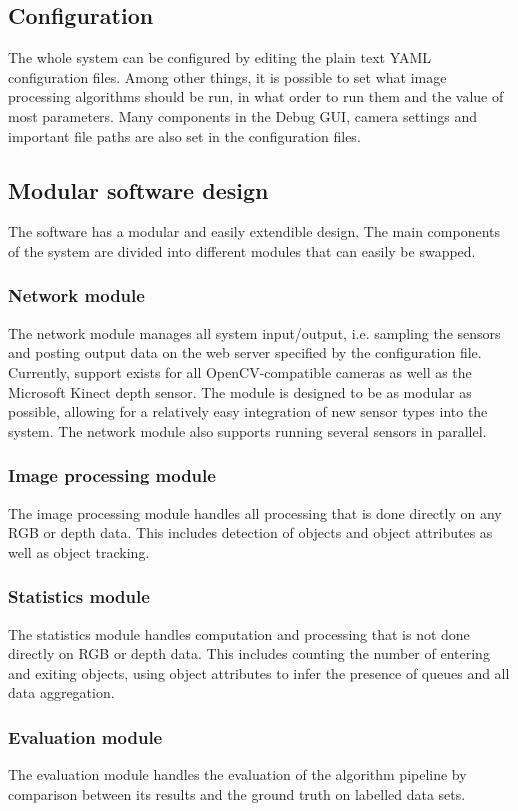 \subsection{Configuration}
The whole system can be configured by editing the plain text YAML configuration files. Among other things, it is possible to set what image processing algorithms should be run, in what order to run them and the value of most parameters. Many components in the Debug GUI, camera settings and important file paths are also set in the configuration files. 

\subsection{Modular software design}
The software has a modular and easily extendible design. The main components of the system are divided into different modules that can easily be swapped. 

\subsubsection{Network module}
The network module manages all system input/output, i.e. sampling the sensors and posting output data on the web server specified by the configuration file. Currently, support exists for all OpenCV-compatible cameras as well as the Microsoft Kinect depth sensor. The module is designed to be as modular as possible, allowing for a relatively easy integration of new sensor types into the system. The network module also supports running several sensors in parallel. 

\subsubsection{Image processing module}
The image processing module handles all processing that is done directly on any RGB or depth data. This includes detection of objects and object attributes as well as object tracking.

\subsubsection{Statistics module}
The statistics module handles computation and processing that is not done directly on RGB or depth data. This includes counting the number of entering and exiting objects, using object attributes to infer the presence of queues and all data aggregation. 

\subsubsection{Evaluation module}
The evaluation module handles the evaluation of the algorithm pipeline by comparison between its results and the ground truth on labelled data sets.  

